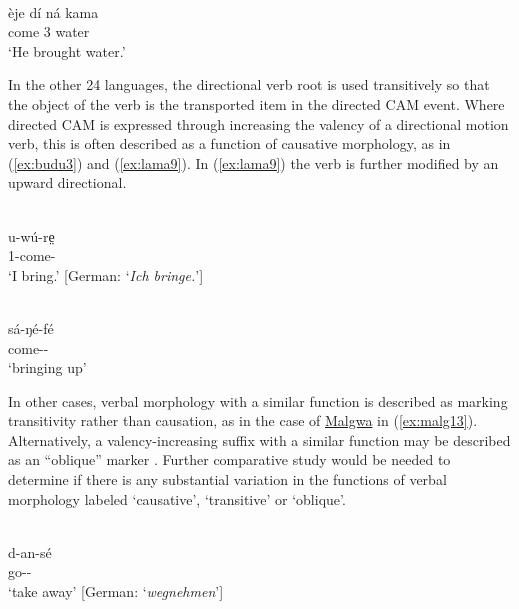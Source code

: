 \ex\label{ex:lele16}
 \\
\gll èje dí ná kama \\
come 3  water \\
\glt `He brought water.'
\z 

In the other 24 languages, the directional verb root is used transitively so that the object of the verb is the transported item in the directed CAM event. Where directed CAM is expressed through increasing the valency of a directional motion verb, this is often described as a function of causative morphology, as in (\ref{ex:budu3}) and (\ref{ex:lama9}). In (\ref{ex:lama9}) the verb is further modified by an upward directional. 

\ea\label{ex:budu3}
 \\
\gll u-wú-re̤ \\
1-come- \\
\glt `I bring.' [German: `\textit{Ich bringe.}']

\ex\label{ex:lama9}
 \\
\gll
sá-ŋé-fé \\
come-- \\
\glt `bringing up'
\z 

In other cases, verbal morphology with a similar function is described as marking transitivity rather than causation, as in the case of \hyperref[malg]{Malgwa} in (\ref{ex:malg13}). Alternatively, a valency-increasing suffix with a similar function may be described as an ``oblique'' marker \citep{robertsObliquesMawa2016}. Further comparative study would be needed to determine if there is any substantial variation in the functions of verbal morphology labeled `causative', `transitive' or `oblique'. 

\ea\label{ex:malg13}
 \\
\gll d-an-sé \\
go-- \\
\glt `take away' [German: `\textit{wegnehmen}']
\z 

